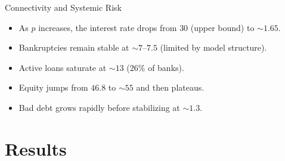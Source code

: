\begin{frame}{Connectivity and Systemic Risk}
  \begin{itemize}
    \item As $p$ increases, the interest rate drops from $30$ (upper bound) to $\sim 1.65$.
    \item Bankruptcies remain stable at $\sim 7$--$7.5$ (limited by model structure).
    \item Active loans saturate at $\sim 13$ ($26\%$ of banks).
    \item Equity jumps from $46.8$ to $\sim 55$ and then plateaus.
    \item Bad debt grows rapidly before stabilizing at $\sim 1.3$.
  \end{itemize}
\end{frame}

\section{Results}\label{sec:7}

